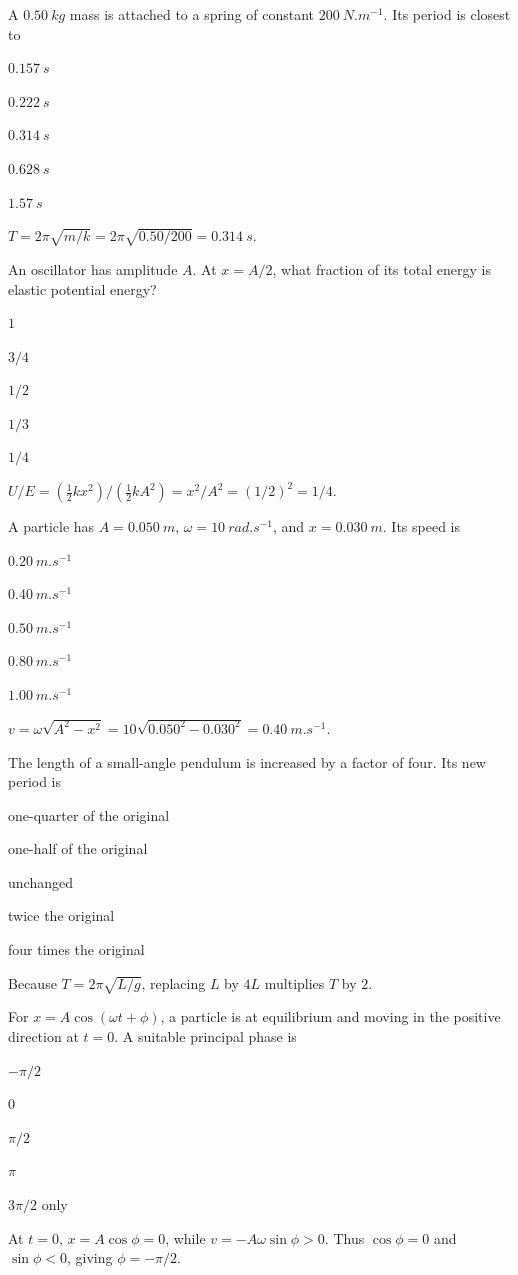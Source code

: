 \documentclass[10pt,a4paper,full]{physicsquiz}
\newcommand{\bankq}[9]{%
  \begin{quizquestion}[
    id=#1,
    topic={#2},
    difficulty=#3,
    marks=1,
    correct=#4,
    tags={#5},
    outcome={#6}
  ]
    #7
    \begin{choiceoptions}
      #8
    \end{choiceoptions}
  \end{quizquestion}
  \begin{quizsolution}
    #9
  \end{quizsolution}
}
\begin{document}
\begin{quizbank}
\bankq{shm-005}{SHM and Energy}{applied}{C}{shm,spring,numerical}{Calculate a mass--spring period.}{%
A \(\SI{0.50}{kg}\) mass is attached to a spring of constant \(\SI{200}{N.m^{-1}}\). Its period is closest to}{%
\item \(\SI{0.157}{s}\)
\item \(\SI{0.222}{s}\)
\item \(\SI{0.314}{s}\)
\item \(\SI{0.628}{s}\)
\item \(\SI{1.57}{s}\)}{%
\(T=2\pi\sqrt{m/k}=2\pi\sqrt{0.50/200}=\SI{0.314}{s}\).}

\bankq{shm-006}{SHM and Energy}{applied}{E}{shm,energy,numerical}{Determine the potential-energy fraction in SHM.}{%
An oscillator has amplitude \(A\). At \(x=A/2\), what fraction of its total energy is elastic potential energy?}{%
\item \(1\)
\item \(3/4\)
\item \(1/2\)
\item \(1/3\)
\item \(1/4\)}{%
\(U/E=(\tfrac12kx^2)/(\tfrac12kA^2)=x^2/A^2=(1/2)^2=1/4\).}

\bankq{shm-007}{SHM and Energy}{applied}{B}{shm,kinematics,numerical}{Calculate speed from displacement in SHM.}{%
A particle has \(A=\SI{0.050}{m}\), \(\omega=\SI{10}{rad.s^{-1}}\), and \(x=\SI{0.030}{m}\). Its speed is}{%
\item \(\SI{0.20}{m.s^{-1}}\)
\item \(\SI{0.40}{m.s^{-1}}\)
\item \(\SI{0.50}{m.s^{-1}}\)
\item \(\SI{0.80}{m.s^{-1}}\)
\item \(\SI{1.00}{m.s^{-1}}\)}{%
\(v=\omega\sqrt{A^2-x^2}=10\sqrt{0.050^2-0.030^2}=\SI{0.40}{m.s^{-1}}\).}

\bankq{shm-008}{SHM and Energy}{applied}{D}{shm,pendulum,scaling}{Apply pendulum period scaling.}{%
The length of a small-angle pendulum is increased by a factor of four. Its new period is}{%
\item one-quarter of the original
\item one-half of the original
\item unchanged
\item twice the original
\item four times the original}{%
Because \(T=2\pi\sqrt{L/g}\), replacing \(L\) by \(4L\) multiplies \(T\) by \(2\).}

\bankq{shm-009}{SHM and Energy}{applied}{A}{shm,phase}{Interpret phase in an SHM expression.}{%
For \(x=A\cos(\omega t+\phi)\), a particle is at equilibrium and moving in the positive direction at \(t=0\). A suitable principal phase is}{%
\item \(-\pi/2\)
\item \(0\)
\item \(\pi/2\)
\item \(\pi\)
\item \(3\pi/2\) only}{%
At \(t=0\), \(x=A\cos\phi=0\), while \(v=-A\omega\sin\phi>0\). Thus \(\cos\phi=0\) and \(\sin\phi<0\), giving \(\phi=-\pi/2\).}


\end{quizbank}
\end{document}
